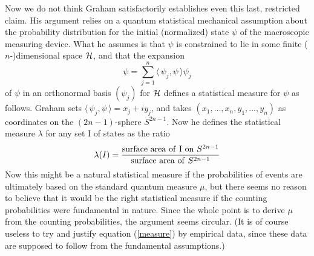 \documentclass[aps,pra,12pt]{revtex4}
\def\inprod#1#2{\langle \,#1 , #2 \,\rangle}
\begin{document}
Now we do not think Graham satisfactorily establishes even this 
last, restricted claim. His argument relies on a quantum statistical 
mechanical assumption about the probability distribution for the initial
(normalized) state $\psi$ of the macroscopic measuring device.
What he assumes is that $\psi$ is constrained to lie in some finite
($n$-)dimensional space ${\cal H}$, and that the expansion
\begin{equation}
\psi = \sum_{j=1}^{n} \inprod{\psi_j}{\psi} \psi_j
\end{equation}
of $\psi$ in an orthonormal basis $( \psi_j )$ for ${\cal H}$ defines 
a statistical measure for $\psi$ as follows. 
Graham sets 
$\inprod{\psi_j}{\psi} = x_j + i y_j$, and takes $(x_1 , \ldots , x_n , y_1 ,
\ldots , y_n )$ as coordinates on the $(2n - 1)$-sphere $S^{2n-1}$. 
Now he defines the statistical measure $\lambda$ 
for any set I of states as the ratio
\begin{equation}\label{measure}
\lambda (I) = 
\frac{{\rm surface~ area~ of~ I~ on} ~S^{2n-1}}{{\rm surface~ area~ of}~ S^{2n-1}}
\end{equation} 
Now this might be a natural statistical measure if the probabilities of
events are ultimately based on the standard 
quantum measure $\mu$, but there seems no reason to believe that it 
would be the right statistical measure if the counting 
probabilities were fundamental in nature. 
Since the whole point is to derive $\mu$ from the counting probabilities,
the argument seems circular. 
(It is of course useless to try and justify equation (\ref{measure}) by
empirical data, since these data are supposed to follow from the 
fundamental assumptions.)
\end{document}
